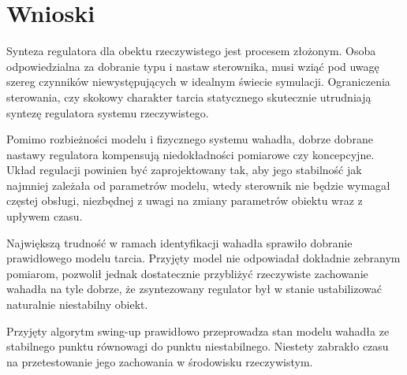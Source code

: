 \documentclass[12pt]{article}
\begin{document}
\newpage

\section{Wnioski}

Synteza regulatora dla obektu rzeczywistego jest procesem złożonym. Osoba
odpowiedzialna za dobranie typu i nastaw sterownika, musi wziąć pod uwagę szereg
czynników niewystępujących w idealnym świecie symulacji. Ograniczenia
sterowania, czy skokowy charakter tarcia statycznego skutecznie utrudniają
syntezę regulatora systemu rzeczywistego.

Pomimo rozbieżności modelu i fizycznego systemu wahadła, dobrze dobrane nastawy
regulatora kompensują niedokładności pomiarowe czy koncepcyjne. Układ regulacji
powinien być zaprojektowany tak, aby jego stabilność jak najmniej zależała od
parametrów modelu, wtedy sterownik nie będzie wymagał częstej obsługi,
niezbędnej z uwagi na zmiany parametrów obiektu wraz z upływem czasu.

Największą trudność w ramach identyfikacji wahadła sprawiło dobranie
prawidłowego modelu tarcia. Przyjęty model nie odpowiadał dokładnie zebranym
pomiarom, pozwolił jednak dostatecznie przybliżyć rzeczywiste zachowanie wahadła
na tyle dobrze, że zsyntezowany regulator był w stanie ustabilizować naturalnie
niestabilny obiekt.

Przyjęty algorytm swing-up prawidłowo przeprowadza stan modelu wahadła ze
stabilnego punktu równowagi do punktu niestabilnego. Niestety zabrakło czasu na
przetestowanie jego zachowania w środowisku rzeczywistym.
\end{document}
